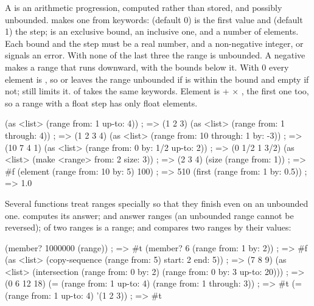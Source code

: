 A  is an arithmetic progression, computed rather than
stored, and possibly unbounded.  makes one from keywords:
 (default 0) is the first value and  (default 1)
the step;  is an exclusive bound,  an
inclusive one, and  a number of elements. Each bound and the
step must be a real number, and  a non-negative integer, or
 signals an error. With none of the
last three the range is unbounded. A negative  makes a range
that runs downward, with the bounds below it. With  0 every
element is , so  or  leaves the
range unbounded if  is within the bound and empty if not;
 still limits it.  of  takes the
same keywords. Element  is  +  $\times$
, the first one too, so a range with a float step has only
float elements.

\begin{dylan}
(as <list> (range from: 1 up-to: 4))              ; => (1 2 3)
(as <list> (range from: 1 through: 4))            ; => (1 2 3 4)
(as <list> (range from: 10 through: 1 by: -3))    ; => (10 7 4 1)
(as <list> (range from: 0 by: 1/2 up-to: 2))      ; => (0 1/2 1 3/2)
(as <list> (make <range> from: 2 size: 3))        ; => (2 3 4)
(size (range from: 1))                            ; => #f
(element (range from: 10 by: 5) 100)              ; => 510
(first (range from: 1 by: 0.5))                   ; => 1.0
\end{dylan}

\noindent Several functions treat ranges specially so that they finish
even on an unbounded one.  computes its answer;
 and  answer ranges (an unbounded range
cannot be reversed);  of two ranges is a range; and
\code{=} compares two ranges by their values:

\begin{dylan}
(member? 1000000 (range))                     ; => #t
(member? 6 (range from: 1 by: 2))             ; => #f
(as <list> (copy-sequence (range from: 5) start: 2 end: 5))  ; => (7 8 9)
(as <list> (intersection (range from: 0 by: 2)
                         (range from: 0 by: 3 up-to: 20)))   ; => (0 6 12 18)
(= (range from: 1 up-to: 4) (range from: 1 through: 3))      ; => #t
(= (range from: 1 up-to: 4) '(1 2 3))                        ; => #t
\end{dylan}

